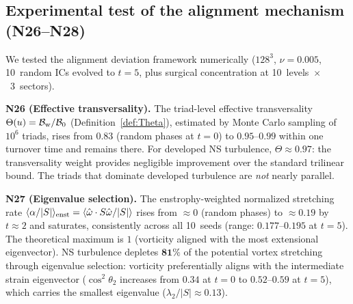 \documentclass[11pt]{article}
\theoremstyle{definition}
\newcommand{\cB}{\mathcal{B}}
\begin{document}
\subsection{Experimental test of the alignment
mechanism (N26--N28)}
\label{sec:alignment-experiment}

We tested the alignment deviation framework
numerically ($128^3$, $\nu=0.005$, 10~random ICs
evolved to $t=5$, plus surgical concentration
at 10~levels~$\times$~3~sectors).

\textbf{N26 (Effective transversality).}
The triad-level effective transversality
$\Theta(u)=\cB_{\rm w}/\cB_0$
(Definition~\ref{def:Theta}), estimated by
Monte Carlo sampling of $10^6$ triads, rises from
$0.83$ (random phases at $t=0$) to
$0.95$--$0.99$ within one turnover time and
remains there.  For developed NS turbulence,
$\Theta\approx 0.97$: the transversality weight
provides negligible improvement over the standard
trilinear bound.  The triads that dominate
developed turbulence are \emph{not} nearly parallel.

\textbf{N27 (Eigenvalue selection).}
The enstrophy-weighted normalized stretching rate
$\langle\alpha/|S|\rangle_{\rm enst}
=\langle\hat\omega\cdot S\hat\omega/|S|\rangle$
rises from $\approx 0$ (random phases) to
$\approx 0.19$ by $t\approx 2$ and saturates,
consistently across all 10~seeds
(range: $0.177$--$0.195$ at $t=5$).
The theoretical maximum is $1$ (vorticity aligned
with the most extensional eigenvector).
NS turbulence depletes $\mathbf{81\%}$ of the
potential vortex stretching through eigenvalue
selection: vorticity preferentially aligns with
the intermediate strain eigenvector
($\cos^2\theta_2$ increases from $0.34$
at $t=0$ to $0.52$--$0.59$ at $t=5$), which
carries the smallest eigenvalue
($\lambda_2/|S|\approx 0.13$).
\end{document}
